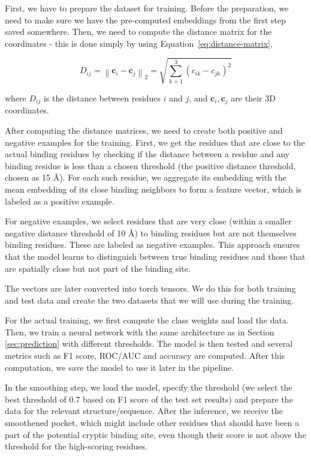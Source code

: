 First, we have to prepare the dataset for training. Before the preparation, we need to make sure we have the pre-computed embeddings from the first step saved somewhere. Then, we need to compute the distance matrix for the coordinates - this is done simply by using Equation~\ref{eq:distance-matrix},

\begin{equation}
D_{ij} = \left\| \mathbf{c}_i - \mathbf{c}_j \right\|_2 = \sqrt{ \sum_{k=1}^3 (c_{ik} - c_{jk})^2 }
\label{eq:distance-matrix}
\end{equation}

where $D_{ij}$ is the distance between residues $i$ and $j$, and $\mathbf{c}_i, \mathbf{c}_j$ are their 3D coordinates.

After computing the distance matrices, we need to create both positive and negative examples for the training. First, we get the residues that are close to the actual binding residues by checking if the distance between a residue and any binding residue is less than a chosen threshold (the positive distance threshold, chosen as 15 \AA). For each such residue, we aggregate its embedding with the mean embedding of its close binding neighbors to form a feature vector, which is labeled as a positive example.

For negative examples, we select residues that are very close (within a smaller negative distance threshold of 10 \AA) to binding residues but are not themselves binding residues. These are labeled as negative examples. This approach ensures that the model learns to distinguish between true binding residues and those that are spatially close but not part of the binding site.

The vectors are later converted into torch tensors. We do this for both training and test data and create the two datasets that we will use during the training.

For the actual training, we first compute the class weights and load the data. Then, we train a neural network with the same architecture as in Section \ref{sec:prediction} with different thresholds. The model is then tested and several metrics such as F1 score, ROC/AUC and accuracy are computed.  After this computation, we save the model to use it later in the pipeline.

In the smoothing step, we load the model, specify the threshold (we select the best threshold of 0.7 based on F1 score of the test set results) and prepare the data for the relevant structure/sequence. After the inference, we receive the smoothened pocket, which might include other residues that should have been a part of the potential cryptic binding site, even though their score is not above the threshold for the high-scoring residues.

